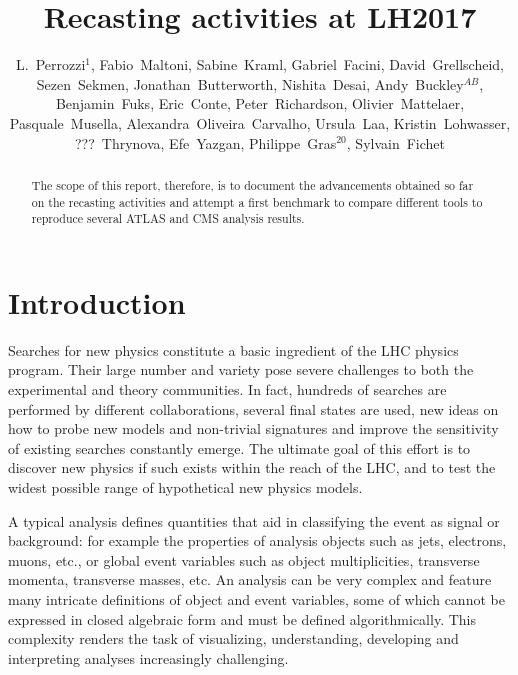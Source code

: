 \documentclass[11pt]{cernrep}
\begin{document}
\setlength\parindent{0pt}

\title{Recasting activities at LH2017}

\author{L.~Perrozzi$^1$, Fabio~Maltoni, Sabine~Kraml, Gabriel~Facini, David~Grellscheid, Sezen~Sekmen,
  Jonathan~Butterworth, Nishita~Desai, Andy~Buckley$^{AB}$, Benjamin~Fuks, Eric~Conte, Peter~Richardson,
  Olivier~Mattelaer, Pasquale~Musella, Alexandra~Oliveira~Carvalho, Ursula~Laa, Kristin~Lohwasser,
  ???~Thrynova, Efe~Yazgan, Philippe~Gras$^{20}$, Sylvain~Fichet}


\maketitle

\begin{abstract}
The scope of this report, therefore, is to document the advancements obtained so far on the recasting
activities and attempt a first benchmark to compare different tools to reproduce several ATLAS and
CMS analysis results.
\end{abstract}

\section{Introduction}

Searches for new physics constitute a basic ingredient of the LHC physics program.
Their large number and variety pose severe challenges to both the experimental and theory communities.
In fact, hundreds of searches are performed by different collaborations, several final states are used,
new ideas on how to probe new models and non-trivial signatures and improve the sensitivity of existing searches constantly emerge.
The ultimate goal of this effort is to discover new physics if such
exists within the reach of the LHC, and to test the widest possible range of hypothetical new physics models.

A typical analysis defines quantities that aid in classifying the event as signal or background: for example
the properties of analysis objects such as jets, electrons, muons, etc., or global event variables
such as object multiplicities, transverse momenta, transverse masses, etc.
An analysis can be very complex and feature many intricate definitions of object and event
variables, some of which cannot be expressed in closed algebraic form and must be defined
algorithmically. This complexity renders the task of visualizing, understanding, developing and
interpreting analyses increasingly challenging.
\end{document}
